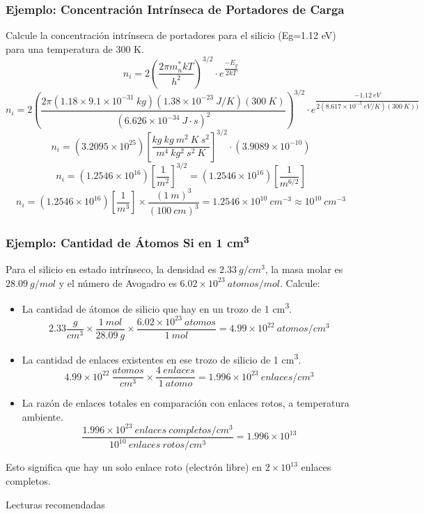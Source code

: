 \documentclass[10pt,t,aspectratio=169]{beamer}
\begin{document}
\begin{frame}[t]
  \frametitle{Ejemplo: Concentración Intrínseca de Portadores de Carga}

  Calcule la concentración intrínseca de portadores para el silicio (Eg=1.12 eV) para una temperatura de 300 K.
  \[ n_i = 2 \left( \dfrac{2\pi{}m_n^* k T}{h^2} \right)^{3/2} \cdot{} e^{\dfrac{-E_g}{2kT}}\]
  \small \[ n_i = 2 \left( \dfrac{2\pi{} (1.18\times{}9.1\times{}10^{-31}\ kg) (1.38\times{}10^{-23}\ J/K) (300\ K)}{(6.626\times{}10^{-34}\ J\cdot{}s)^2} \right)^{3/2} \cdot{} e^{\dfrac{-1.12\ eV}{2(8.617\times{}10^{-5}\ eV/K)(300\ K))}}\]
  \normalsize \[ n_i = (3.2095\times{}10^{25}) \left[ \dfrac{kg\ kg\ m^2\ K\ s^2}{m^4\ kg^2\ s^2\ K} \right]^{3/2} \cdot (3.9089\times{}10^{-10}) \]
  \[ n_i = (1.2546\times{}10^{16}) \left[ \dfrac{1}{m^2} \right]^{3/2} = (1.2546\times{}10^{16}) \left[ \dfrac{1}{m^{6/2}} \right] \]
  \[ n_i = (1.2546\times{}10^{16}) \left[ \dfrac{1}{m^{3}} \right] \times{} \dfrac{(1\ m)^3}{(100\ cm)^3} = 1.2546\times{}10^{10}\ cm^{-3} \approx \boxed{10^{10}\ cm^{-3}} \]

\end{frame}


\begin{frame}[t]
  \frametitle{Ejemplo: Cantidad de Átomos Si en 1 cm\textsuperscript{3}}

  Para el silicio en estado intrínseco, la densidad es $2.33\ g/cm^3$, la masa molar es $28.09\ g/mol$ y el número de Avogadro es $6.02\times{}10^{23}\ atomos/mol$. Calcule:

  \begin{itemize}
    \item La cantidad de átomos de silicio que hay en un trozo de 1 cm\textsuperscript{3}.
    \[ 2.33\dfrac{g}{cm^3} \times{}  \dfrac{1\ mol}{28.09\ g} \times{} \dfrac{6.02\times{}10^{23}\ atomos}{1\ mol} = 4.99\times{}10^{22}\ atomos/cm^{3} \]
    \item La cantidad de enlaces existentes en ese trozo de silicio de 1 cm\textsuperscript{3}.
    \[ 4.99\times{}10^{22}\ \dfrac{atomos}{cm^3} \times{} \dfrac{4\ enlaces}{1\ atomo} = 1.996\times{}10^{23}\ enlaces/cm^3 \]
    \item La razón de enlaces totales en comparación con enlaces rotos, a 
    temperatura ambiente.
    \[ \dfrac{1.996\times{}10^{23}\ enlaces\ completos/cm^3}{10^{10}\ enlaces\ rotos/cm^3} = 1.996\times{}10^{13} \]
  \end{itemize}
  
  Esto significa que hay un solo enlace roto (electrón libre) en $2\times{}10^{13}$ enlaces completos.

\end{frame}


\begin{frame}{Lecturas recomendadas}
    
\end{frame}
\end{document}
